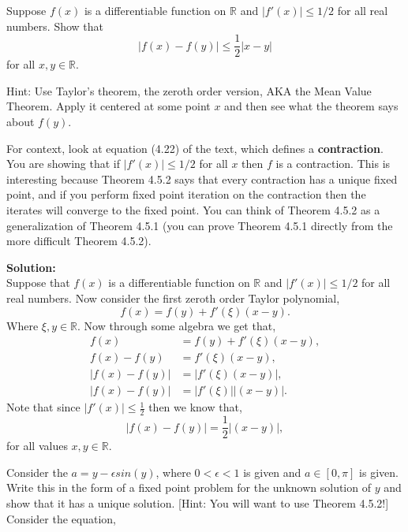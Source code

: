 \documentclass[12pt]{article}
\makeatletter
\theoremstyle{homework}
\newenvironment{exercise}[1]
{\def\@currentlabel{#1}\exercisecore}
{\endexercisecore}
\newcommand{\localhead}[1]{\par\smallskip\noindent\textbf{#1}\nobreak\\}%
\newcommand\solution{\localhead{Solution:}}
\newcommand{\Reals}{\ensuremath{\mathbb R}}
\makeatother
\begin{document}
\begin{exercise}{Supplemental 1}
Suppose $f(x)$ is a differentiable function 
on $\mathbb{R}$ and $|f'(x)|\le 1/2$ for
all real numbers.  Show that
\[
|f(x)-f(y)|\le \frac{1}{2} |x-y|
\]
for all $x,y\in \mathbb{R}$.

Hint: Use Taylor's theorem, the zeroth order version, AKA the Mean Value Theorem.  Apply it centered at some point $x$ and then see what the theorem says about $f(y)$.

For context, look at equation (4.22) of the text, which defines a \textbf{contraction}.  You are showing that if $|f'(x)|\le 1/2$ for all $x$ then
$f$ is a contraction.  This is interesting because Theorem 4.5.2 says
that every contraction has a unique fixed point, and if you perform fixed
point iteration on the contraction then the iterates will converge to the fixed point.  You can think of Theorem 4.5.2 as a generalization of Theorem 4.5.1 (you can prove Theorem 4.5.1 directly from the more difficult Theorem 4.5.2).
\end{exercise}

\solution
Suppose that  $f(x)$ is a differentiable function 
on $\mathbb{R}$ and $|f'(x)|\le 1/2$ for
all real numbers. Now consider the first zeroth order Taylor polynomial, 
\begin{equation*}
  f(x) = f(y) + f'(\xi)(x - y).
\end{equation*}
Where $\xi,y \in \Reals$. Now through some algebra we get that,
\begin{align*}
  f(x) &= f(y) + f'(\xi)(x - y),\\
  f(x) - f(y) &= f'(\xi)(x - y),\\
  |f(x) - f(y)| &= |f'(\xi)(x - y)|,\\
  |f(x) - f(y)| &= |f'(\xi)||(x - y)|.
\end{align*}
Note that since $|f'(x)| \le \frac{1}{2}$ then we know that,
\begin{equation*}
  |f(x) - f(y)| =  \frac{1}{2}|(x - y)|,
\end{equation*}
for all values $x,y\in \mathbb{R}$.














\begin{exercise}{Chapter 4: 13} Consider the $a = y - \epsilon sin(y)$, where $0 < \epsilon < 1$ is given and
  $a \in [0,\pi]$ is given. Write this in the form of a fixed point problem for the unknown solution of $y$
  and show that it has a unique solution. [Hint: You will want to use Theorem 4.5.2!]
\end{exercise} Consider the equation,
\end{document}
